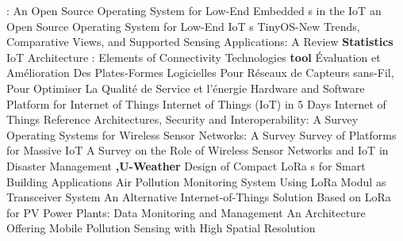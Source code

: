  \cite{baccelli_riot_2018} {{}}: {{An Open Source Operating System}} for {{Low}}-{{End Embedded s}} in the {{IoT}} \newline 
 \cite{baccelli_riot_2018-1} {{}} an {{Open Source Operating System}} for {{Low}}-End {{IoT s}} \newline 
 \cite{amjad_tinyos-new_2016} {{TinyOS}}-{{New Trends}}, {{Comparative Views}}, and {{Supported Sensing Applications}}: {{A Review}} \newline 
\textbf{Statistics} \newline  \cite{sarwar_iot_2015} {{IoT Architecture}} : {{Elements}} of {{Connectivity Technologies}} \newline 
\textbf{tool} \newline  \cite{roussel_evaluation_2016} Évaluation et Amélioration Des Plates-Formes Logicielles Pour Réseaux de Capteurs sans-Fil, Pour Optimiser La Qualité de Service et l’énergie \newline 
 \cite{bregell_hardware_2015} Hardware and Software Platform for {{Internet}} of {{Things}} \newline 
 \cite{colina_internet_2016} Internet of {{Things}} ({{IoT}}) in 5 Days \newline 
 \cite{di_martino_internet_2018} Internet of Things Reference Architectures, Security and Interoperability: {{A}} Survey \newline 
 \cite{farooq_operating_2011} Operating {{Systems}} for {{Wireless Sensor Networks}}: {{A Survey}} \newline 
 \cite{hejazi_survey_2018} Survey of Platforms for Massive {{IoT}} \newline 
 \cite{durrani_survey_2019} A {{Survey}} on the {{Role}} of {{Wireless Sensor Networks}} and {{IoT}} in {{Disaster Management}} \newline 
\textbf{,U-Weather} \newline  \cite{afonso_design_2019} Design of {{Compact LoRa s}} for {{Smart Building Applications}} \newline 
 \cite{rosmiati_air_2019} Air Pollution Monitoring System Using {{LoRa}} Modul as Transceiver System \newline 
 \cite{paredes-parra_alternative_2019} An {{Alternative Internet}}-of-{{Things Solution Based}} on {{LoRa}} for {{PV Power Plants}}: {{Data Monitoring}} and {{Management}} \newline 
 \cite{alvear_architecture_2016} An {{Architecture Offering Mobile Pollution Sensing}} with {{High Spatial Resolution}} \newline 
